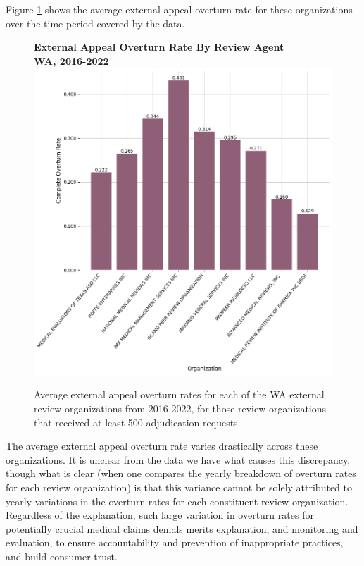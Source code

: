 \documentclass[12pt, a4paper,twoside,parskip=full]{report}
\theoremstyle{plain} %
\theoremstyle{definition} %
\theoremstyle{remark} %
\numberwithin{equation}{chapter}
\begin{document}
		Figure \ref{waexternalappealoverturnratebyreviewagent} shows the average external appeal overturn rate for these organizations over the time period covered by the data.
		
		
		\begin{figure}[h!]
			\centering
			\textbf{External Appeal Overturn Rate By Review Agent}\\
			\textbf{WA, 2016-2022}\\
			\includegraphics[width=.8\textwidth]{images/wa_external_appeals/external_appeal_overturn_rates_by_agent.png}
			\caption{Average external appeal overturn rates for each of the WA external review organizations from 2016-2022, for those review organizations that received at least 500 adjudication requests.}
			\label{waexternalappealoverturnratebyreviewagent}
		\end{figure}
		\clearpage
	
		The average external appeal overturn rate varies drastically across these organizations. It is unclear from the data we have what causes this discrepancy, though what is clear (when one compares the yearly breakdown of overturn rates for each review organization) is that this variance cannot be solely attributed to yearly variations in the overturn rates for each constituent review organization. Regardless of the explanation, such large variation in overturn rates for potentially crucial medical claims denials merits explanation, and monitoring and evaluation, to ensure accountability and prevention of inappropriate practices, and build consumer trust.
		
\end{document}
